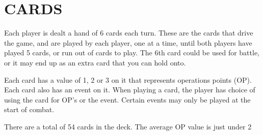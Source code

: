 \section{CARDS}
Each player is dealt a hand of 6 cards each turn. These are the cards that drive the game, and are played by each player, one at a time, until both players have played 5 cards, or run out of cards to play. The 6th card could be used for battle, or it may end up as an extra card that you can hold onto.

Each card has a value of 1, 2 or 3 on it that represents operations points (OP). Each card also has an event on it. When playing a card, the player has choice of using the card for OP’s or the event. Certain events may only be played at the start of combat.

There are a total of 54 cards in the deck. The average OP value is just under 2